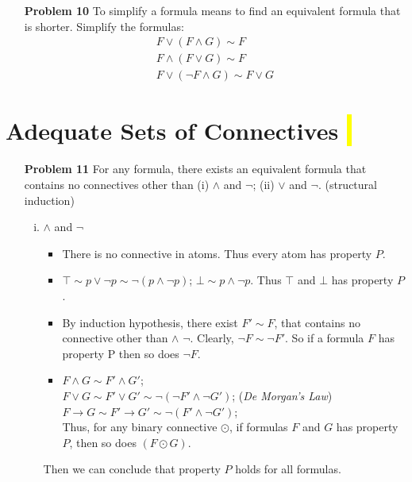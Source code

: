 \documentclass[12pt]{article}
\begin{document}
\begin{enumerate}
\item[\textbf{Problem 10}] To simplify a formula means to find an equivalent formula that is shorter. Simplify the formulas: 
\begin{gather*} 
 F \vee ( F \wedge G) \sim F \\
 F \wedge (F \vee G) \sim F \\
 F \vee (\neg F \wedge G) \sim F \vee G
\end{gather*}
 \end{enumerate}
 
 \newpage
\section{Adequate Sets of Connectives \colorbox{yellow}{$~$ }}
\begin{enumerate}
\item[\textbf{Problem 11}] For any formula, there exists an equivalent formula that contains no connectives other than (i) $\wedge$ and $\neg$; (ii) $\vee$ and $\neg$.  (structural induction)
    \begin{enumerate} [(i)]
        \item $\wedge$ and $\neg$ 
            \begin{itemize}
                \item There is no connective in atoms. Thus every atom has property $P$. 
                \item $\top \sim p \vee \neg p \sim \neg (p \wedge \neg p)$; $\bot \sim p \wedge \neg p$. Thus $\top$ and $\bot$ has property $P$. 
                \item By induction hypothesis, there exist $F' \sim F$, that contains no connective other than $\wedge$  $\neg$.  Clearly, $\neg F \sim \neg F'$.  So if a formula $F$ has property P then so does $\neg F$. 
                \item $F \wedge G \sim F' \wedge G'$; \\
                 $F \vee G \sim F' \vee G' \sim \neg (\neg F' \wedge \neg G')$; (\textit{De Morgan's Law}) \\
                 $ F \rightarrow G \sim F' \rightarrow G' \sim \neg (F' \wedge \neg G')$;\\
                  Thus, for any binary connective $\odot$, if formulas $F$ and $G$ has property $P$, then so does $(F \odot G)$. 
            \end{itemize}
       Then we can conclude that property $P$ holds for all formulas.   
       

\end{enumerate}
\end{enumerate}
\end{document}
